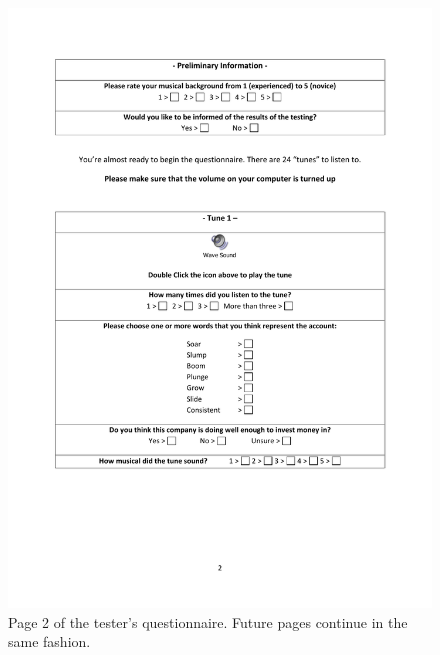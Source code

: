 \begin{figure}[ht]
\centering
\includegraphics[scale=0.6]{qt2}
\caption{Page 2 of the tester's questionnaire. Future pages continue in the same fashion.}
\label{fig:qt2}
\end{figure}